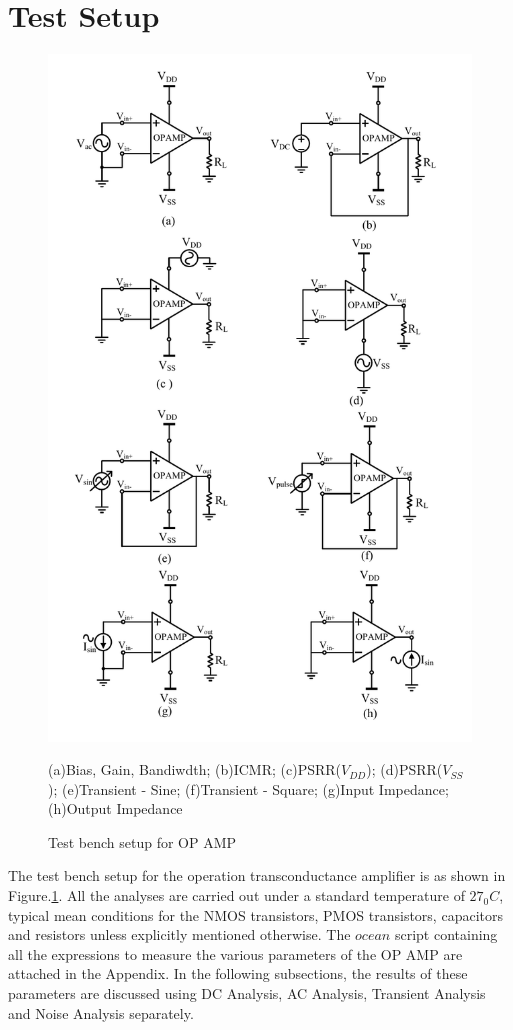 \section{Test Setup}
\begin{figure} [H]
\centering
\includegraphics[scale=0.75]{Figures/Test_Benches/OPAMP_TB.pdf}
\caption{Test bench setup for OP AMP}
\label{fig:OPAMP_TB}
(a)Bias, Gain, Bandiwdth; (b)ICMR; (c)PSRR($V_{DD}$); (d)PSRR($V_{SS}$); (e)Transient - Sine; (f)Transient - Square; (g)Input Impedance; (h)Output Impedance
\end{figure}

The test bench setup for the operation transconductance amplifier is as shown in Figure.\ref{fig:OPAMP_TB}. All the analyses are carried out under a standard temperature of $27_0C$, typical mean conditions for the NMOS transistors, PMOS transistors, capacitors and resistors unless explicitly mentioned otherwise. The $ocean$ script containing all the expressions to measure the various parameters of the OP AMP are attached in the Appendix. In the following subsections, the results of these parameters are discussed using DC Analysis, AC Analysis, Transient Analysis and Noise Analysis separately.

